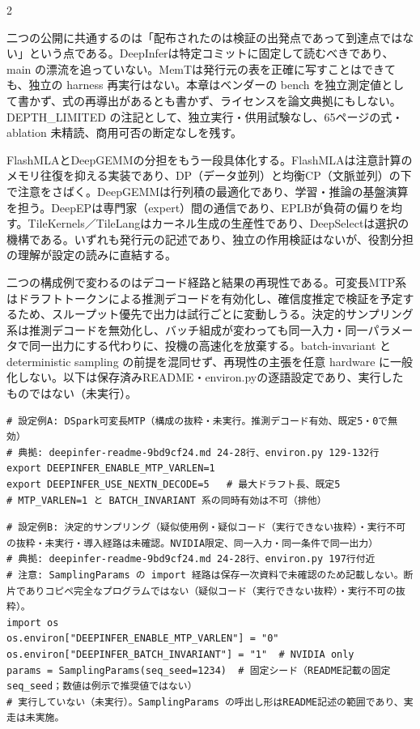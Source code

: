 \documentclass[lualatex,a4paper,10pt]{jlreq}
\begin{document}
\begin{multicols}{2} %


二つの公開に共通するのは「配布されたのは検証の出発点であって到達点ではない」という点である。DeepInferは特定コミットに固定して読むべきであり、main の漂流を追っていない。MemTは発行元の表を正確に写すことはできても、独立の harness 再実行はない。本章はベンダーの bench を独立測定値として書かず、式の再導出があるとも書かず、ライセンスを論文典拠にもしない。DEPTH\_LIMITED の注記として、独立実行・供用試験なし、65ページの式・ablation 未精読、商用可否の断定なしを残す。


FlashMLAとDeepGEMMの分担をもう一段具体化する。FlashMLAは注意計算のメモリ往復を抑える実装であり、DP（データ並列）と均衡CP（文脈並列）の下で注意をさばく。DeepGEMMは行列積の最適化であり、学習・推論の基盤演算を担う。DeepEPは専門家（expert）間の通信であり、EPLBが負荷の偏りを均す。TileKernels／TileLangはカーネル生成の生産性であり、DeepSelectは選択の機構である。いずれも発行元の記述であり、独立の作用検証はないが、役割分担の理解が設定の読みに直結する。


二つの構成例で変わるのはデコード経路と結果の再現性である。可変長MTP系はドラフトトークンによる推測デコードを有効化し、確信度推定で検証を予定するため、スループット優先で出力は試行ごとに変動しうる。決定的サンプリング系は推測デコードを無効化し、バッチ組成が変わっても同一入力・同一パラメータで同一出力にする代わりに、投機の高速化を放棄する。batch-invariant と deterministic sampling の前提を混同せず、再現性の主張を任意 hardware に一般化しない。以下は保存済みREADME・environ.pyの逐語設定であり、実行したものではない（未実行）。


\end{multicols} %
{\footnotesize
\begin{verbatim}
# 設定例A: DSpark可変長MTP（構成の抜粋・未実行。推測デコード有効、既定5・0で無効）
# 典拠: deepinfer-readme-9bd9cf24.md 24-28行、environ.py 129-132行
export DEEPINFER_ENABLE_MTP_VARLEN=1
export DEEPINFER_USE_NEXTN_DECODE=5   # 最大ドラフト長、既定5
# MTP_VARLEN=1 と BATCH_INVARIANT 系の同時有効は不可（排他）
\end{verbatim}
} %
{\footnotesize
\begin{verbatim}
# 設定例B: 決定的サンプリング（疑似使用例・疑似コード（実行できない抜粋）・実行不可の抜粋・未実行・導入経路は未確認。NVIDIA限定、同一入力・同一条件で同一出力）
# 典拠: deepinfer-readme-9bd9cf24.md 24-28行、environ.py 197行付近
# 注意: SamplingParams の import 経路は保存一次資料で未確認のため記載しない。断片でありコピペ完全なプログラムではない（疑似コード（実行できない抜粋）・実行不可の抜粋）。
import os
os.environ["DEEPINFER_ENABLE_MTP_VARLEN"] = "0"
os.environ["DEEPINFER_BATCH_INVARIANT"] = "1"  # NVIDIA only
params = SamplingParams(seq_seed=1234)  # 固定シード（README記載の固定 seq_seed；数値は例示で推奨値ではない）
# 実行していない（未実行）。SamplingParams の呼出し形はREADME記述の範囲であり、実走は未実施。
\end{verbatim}
} %
\end{document}
